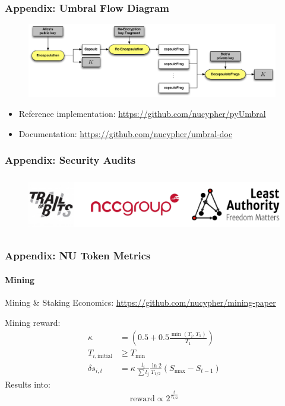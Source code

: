 \documentclass[xetex,mathsans,sans,aspectratio=169]{beamer}
\begin{document}
    \begin{frame}
      \frametitle{Appendix: Umbral Flow Diagram}
      \begin{figure}
        \centering
        \includegraphics[width=11cm]{pdf/umbral-kem-flow.pdf}
      \end{figure}
      \begin{itemize}
           \item Reference implementation: \url{https://github.com/nucypher/pyUmbral}
           \item Documentation: \url{https://github.com/nucypher/umbral-doc}
      \end{itemize}
    \end{frame}

    \begin{frame}
        \frametitle{Appendix: Security Audits}
        \begin{figure}
            \centering
            \includegraphics[height=2.5cm]{pdf/security-audits.pdf}
      \end{figure}
    \end{frame}

    \begin{frame}
        \frametitle{Appendix: NU Token Metrics}
        \framesubtitle{Mining}
        Mining \& Staking Economics: \url{https://github.com/nucypher/mining-paper}

        \bigskip

        Mining reward:
        \begin{align}
            \kappa &= \left(0.5 + 0.5\frac{\min(T_i, T_1)}{T_1}\right) \nonumber \\
            T_{i,\text{initial}} &\ge T_{\min} \nonumber \\
            \delta s_{i,t} &=  \kappa\, \frac{l_i}{\sum l_j} \frac{\ln{2}}{T_{1/2}} \left( S_{\max} - S_{t-1}\right) \nonumber
        \end{align}
        Results into:
        $$\text{reward} \propto 2^{\frac{t}{T_{1/2}}}$$
    \end{frame}
\end{document}
